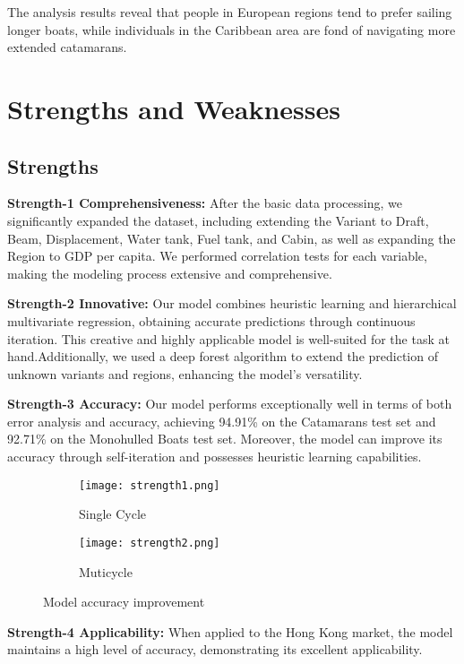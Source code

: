 \documentclass[12pt]{article}  %
\begin{document}
The analysis results reveal that people in European regions tend to prefer sailing longer boats, while individuals in the Caribbean area are fond of navigating more extended catamarans.

\section{Strengths and Weaknesses}
\subsection{Strengths}

\textbf{Strength-1 Comprehensiveness:}
After the basic data processing, we significantly expanded the dataset, including extending the Variant to Draft, Beam, Displacement, Water tank, Fuel tank, and Cabin, as well as expanding the Region to GDP per capita. We performed correlation tests for each variable, making the modeling process extensive and comprehensive.

\textbf{Strength-2 Innovative:}
Our model combines heuristic learning and hierarchical multivariate regression, obtaining accurate predictions through continuous iteration. This creative and highly applicable model is well-suited for the task at hand.Additionally, we used a deep forest algorithm to extend the prediction of unknown variants and regions, enhancing the model's versatility. 

\textbf{Strength-3 Accuracy:}
Our model performs exceptionally well in terms of both error analysis and accuracy, achieving 94.91\% on the Catamarans test set and 92.71\% on the Monohulled Boats test set. Moreover, the model can improve its accuracy through self-iteration and possesses heuristic learning capabilities.

\begin{figure}[htbp]
    \centering
    \begin{subfigure}[b]{.4\textwidth}
    \texttt{[image: strength1.png]}
    \caption{Single Cycle}\label{subfig:SG1}
    \end{subfigure}
    \begin{subfigure}[b]{.4\textwidth}
    \texttt{[image: strength2.png]}
    \caption{Muticycle}\label{subfig:SG2}
    \end{subfigure}
    \caption{Model accuracy improvement}\label{fig:strength}
\end{figure} 

\textbf{Strength-4 Applicability:}
When applied to the Hong Kong market, the model maintains a high level of accuracy, demonstrating its excellent applicability. 
\end{document}
